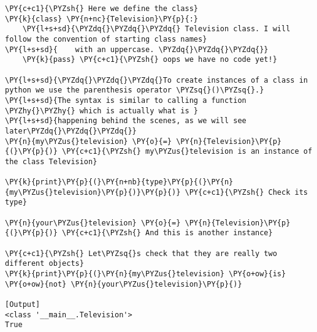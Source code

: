 \begin{Verbatim}[label=\makebox{\url{https://github.com/lucabaldini/cmepda/tree/master/slides/latex/snippets/class\_tv\_basic.py}},commandchars=\\\{\}]
\PY{c+c1}{\PYZsh{} Here we define the class}
\PY{k}{class} \PY{n+nc}{Television}\PY{p}{:}
    \PY{l+s+sd}{\PYZdq{}\PYZdq{}\PYZdq{} Television class. I will follow the convention of starting class names}
\PY{l+s+sd}{    with an uppercase. \PYZdq{}\PYZdq{}\PYZdq{}}
    \PY{k}{pass} \PY{c+c1}{\PYZsh{} oops we have no code yet!}

\PY{l+s+sd}{\PYZdq{}\PYZdq{}\PYZdq{}To create instances of a class in python we use the parenthesis operator \PYZsq{}()\PYZsq{}.}
\PY{l+s+sd}{The syntax is similar to calling a function \PYZhy{}\PYZhy{} which is actually what is }
\PY{l+s+sd}{happening behind the scenes, as we will see later\PYZdq{}\PYZdq{}\PYZdq{}}
\PY{n}{my\PYZus{}television} \PY{o}{=} \PY{n}{Television}\PY{p}{(}\PY{p}{)} \PY{c+c1}{\PYZsh{} my\PYZus{}television is an instance of the class Television}

\PY{k}{print}\PY{p}{(}\PY{n+nb}{type}\PY{p}{(}\PY{n}{my\PYZus{}television}\PY{p}{)}\PY{p}{)} \PY{c+c1}{\PYZsh{} Check its type}

\PY{n}{your\PYZus{}television} \PY{o}{=} \PY{n}{Television}\PY{p}{(}\PY{p}{)} \PY{c+c1}{\PYZsh{} And this is another instance}

\PY{c+c1}{\PYZsh{} Let\PYZsq{}s check that they are really two different objects}
\PY{k}{print}\PY{p}{(}\PY{n}{my\PYZus{}television} \PY{o+ow}{is} \PY{o+ow}{not} \PY{n}{your\PYZus{}television}\PY{p}{)}

[Output]
<class '__main__.Television'>
True
\end{Verbatim}